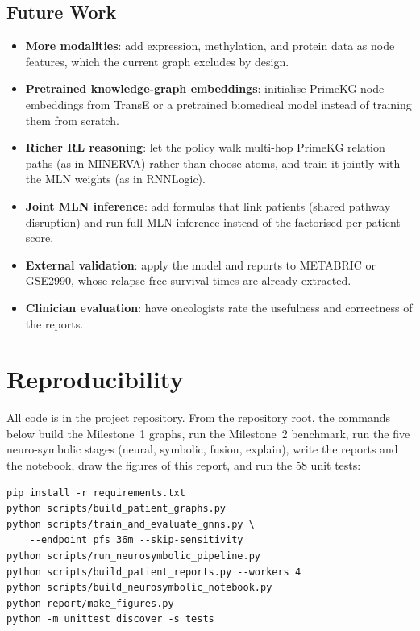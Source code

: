 \documentclass{mnnit}
\begin{document}
\section{Future Work}
\begin{itemize}
  \item \textbf{More modalities}: add expression, methylation, and protein data as node features, which the current
        graph excludes by design.
  \item \textbf{Pretrained knowledge-graph embeddings}: initialise PrimeKG node embeddings from TransE or a
        pretrained biomedical model instead of training them from scratch.
  \item \textbf{Richer RL reasoning}: let the policy walk multi-hop PrimeKG relation paths (as in MINERVA) rather than
        choose atoms, and train it jointly with the MLN weights (as in RNNLogic).
  \item \textbf{Joint MLN inference}: add formulas that link patients (shared pathway disruption) and run full MLN
        inference instead of the factorised per-patient score.
  \item \textbf{External validation}: apply the model and reports to METABRIC or GSE2990, whose relapse-free survival
        times are already extracted.
  \item \textbf{Clinician evaluation}: have oncologists rate the usefulness and correctness of the reports.
\end{itemize}

\appendix
\chapter{Reproducibility}

All code is in the project repository. From the repository root, the commands below build the Milestone~1 graphs, run the Milestone~2 benchmark, run the five neuro-symbolic stages (neural, symbolic, fusion, explain), write the reports and the notebook, draw the figures of this report, and run the 58 unit tests:

\begin{verbatim}
pip install -r requirements.txt
python scripts/build_patient_graphs.py
python scripts/train_and_evaluate_gnns.py \
    --endpoint pfs_36m --skip-sensitivity
python scripts/run_neurosymbolic_pipeline.py
python scripts/build_patient_reports.py --workers 4
python scripts/build_neurosymbolic_notebook.py
python report/make_figures.py
python -m unittest discover -s tests
\end{verbatim}
\end{document}
